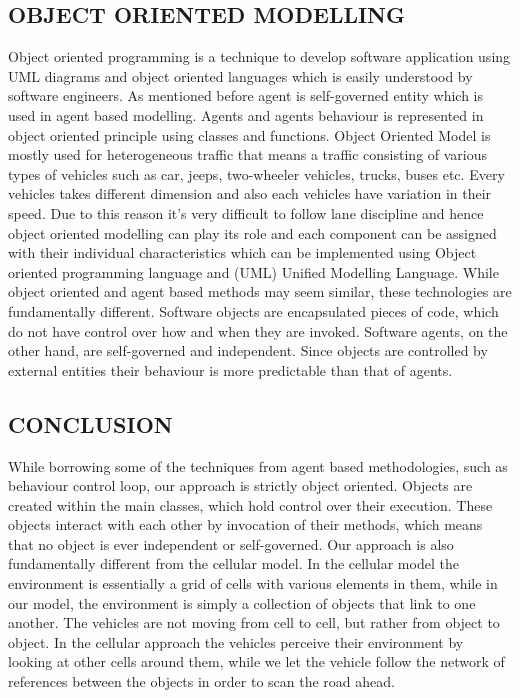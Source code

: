 \documentclass[11pt,a4paper]{article}
\begin{document}
	\subsection{OBJECT ORIENTED MODELLING}
	 Object oriented programming is a technique to develop software application using UML diagrams and object oriented languages which is easily understood by software engineers. As mentioned before agent is self-governed entity which is used in agent based modelling. Agents and agents behaviour is represented in object oriented principle using classes and functions. Object Oriented Model is mostly used for heterogeneous traffic that means a traffic consisting of various types of vehicles such as car, jeeps, two-wheeler vehicles, trucks, buses etc. Every vehicles takes different dimension and also each vehicles have variation in their speed. Due to this reason it’s very difficult to follow lane discipline and hence object oriented modelling can play its role and each component can be assigned with their individual characteristics which can be implemented using Object oriented programming language and (UML) Unified Modelling Language.\cite{gowri09} While object oriented and agent based methods may seem similar, these technologies are fundamentally different. Software objects are encapsulated pieces of code, which do not have control over how and when they are invoked. Software agents, on the other hand, are self-governed and independent. Since objects are controlled by external entities their behaviour is more predictable than that of agents. \cite{mcburney07}
	 		
	\subsection{CONCLUSION}
	While borrowing some of the techniques from agent based methodologies, such as behaviour control loop, our approach is strictly object oriented. Objects are created within the main classes, which hold control over their execution. These objects interact with each other by invocation of their methods, which means that no object is ever independent or self-governed.
	Our approach is also fundamentally different from the cellular model. In the cellular model the environment is essentially a grid of cells with various elements in them, while in our model, the environment is simply a collection of objects that link to one another. The vehicles are not moving from cell to cell, but rather from object to object. In the cellular approach the vehicles perceive their environment by looking at other cells around them, while we let the vehicle follow the network of references between the objects in order to scan the road ahead. 
\end{document}
